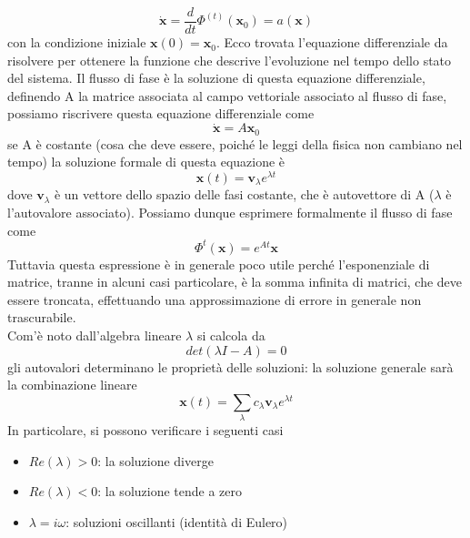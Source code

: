 \documentclass[
10pt, %
a4paper, %
oneside, %
headinclude,footinclude, %
BCOR5mm, %
]{scrartcl}
\begin{document}
\[\mathbf{\dot{x}} = \frac{d}{dt}\Phi^{(t)}(\mathbf{x}_0) = a(\mathbf{x})\]
con la condizione iniziale \(\mathbf{x}(0) = \mathbf{x}_0\). Ecco trovata l'equazione differenziale da risolvere per ottenere la funzione che descrive l'evoluzione nel tempo dello stato del sistema. Il flusso di fase è la soluzione di questa equazione differenziale, definendo A la matrice associata al campo vettoriale associato al flusso di fase, possiamo riscrivere questa equazione differenziale come
\[\mathbf{\dot{x}} = A\mathbf{x}_0\]
se A è costante (cosa che deve essere, poiché le leggi della fisica non cambiano nel tempo) la soluzione formale di questa equazione è
\[\mathbf{x}(t) = \mathbf{v}_\lambda e^{\lambda t}\]
dove \(\mathbf{v}_\lambda\) è un vettore dello spazio delle fasi costante, che è autovettore di A ($\lambda$ è l'autovalore associato). Possiamo dunque esprimere formalmente il flusso di fase come
\[\Phi^t(\mathbf{x}) = e^{At} \mathbf{x}\]
Tuttavia questa espressione è in generale poco utile perché l'esponenziale di matrice, tranne in alcuni casi particolare, è la somma infinita di matrici, che deve essere troncata, effettuando una approssimazione di errore in generale non trascurabile.\\
Com'è noto dall'algebra lineare \(\lambda\) si calcola da 
\[det(\lambda I - A) = 0\]
gli autovalori determinano le proprietà delle soluzioni: la soluzione generale sarà la combinazione lineare 
\[\mathbf{x}(t) = \sum_\lambda c_\lambda \mathbf{v}_\lambda e^{\lambda t}\]
In particolare, si possono verificare i seguenti casi
\begin{itemize}
	\item \(Re(\lambda)>0\): la soluzione diverge
	\item \(Re(\lambda)<0\): la soluzione tende a zero
	\item \(\lambda = i\omega\): soluzioni oscillanti (identità di Eulero)
\end{itemize}
\end{document}
